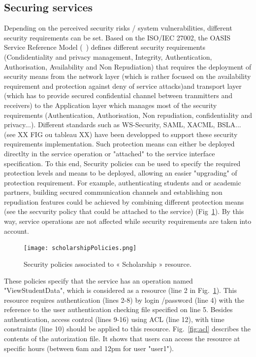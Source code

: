 \documentclass[runningheads,a4paper]{llncs}
\begin{document}
\subsection{Securing services}
Depending on the perceived security risks / system vulnerabilities, different security requirements can be set. Based on the ISO/IEC 27002, the OASIS Service Reference Model (~\cite{OAS06}) defines different security requirements (Condidentiality and privacy management, Integrity, Authentication, Authorisation, Availability and Non Repudiation) that  requires the deployment of security means from the network layer (which is rather focused on the availability requirement and protection against deny of service attacks)and transport layer (which has to provide secured confidential channel between tranmitters and receivers) to the Application layer which manages most of the security requirements (Authentication, Authorisation, Non repudiation, confidentiality and privacy...). Different standards such as WS-Security, SAML, XACML, BSLA...(see XX FIG ou tableau XX) have been developped to support these security requirements implementation.
Such protection means can either be deployed directlty in the service operation or "attached" to the service interface specification. To this end, Security policies can be used to specify the required protection levels and means to be deployed, allowing an easier "upgrading" of protection requirement. 
For example, authenticating students and or academic partners, building secured communication channels and establishing non repudiation features could be achieved by combining different protection means (see the secvurity policy that could be attached to the service) (Fig~\ref{fig:policy}). By this way, service operations are not affected while security requirements are taken into account.

\begin{figure}  
\centering
\texttt{[image: scholarshipPolicies.png]}
\caption{Security policies associated to « Scholarship » resource.}
\label{fig:policy}
\end{figure}
These policies specify that the service has an operation named "ViewStudentData", which is considered as a resource (line 2 in Fig.~\ref{fig:policy}). This resource requires authentication (lines 2-8) by login /password (line 4) with the reference to the user authentication checking file specified on line 5. Besides authentication, access control (lines 9-16) using ACL (line 12), with time constraints (line 10) should be applied to this resource. Fig.~\ref{fig:acl} describes the contents of the  autorization file. It shows that users can access the resource at specific hours (between 6am and 12pm for user "user1").
 
\end{document}
